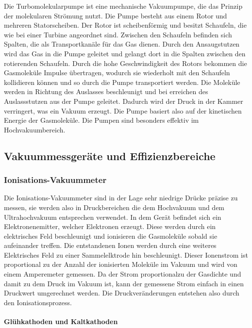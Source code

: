 Die Turbomolekularpumpe ist eine mechanische Vakuumpumpe, die das Prinzip der molekularen Strömung nutzt.
Die Pumpe besteht aus einem Rotor und mehreren Statorscheiben. Der Rotor ist scheibenförmig und besitzt Schaufeln, die wie bei einer Turbine angeordnet sind.
Zwischen den Schaufeln befinden sich Spalten, die als Transportkanäle für das Gas dienen.
Durch den Ansaugstutzen wird das Gas in die Pumpe geleitet und gelangt dort in die Spalten zwischen den rotierenden Schaufeln. Durch die
hohe Geschwindigkeit des Rotors bekommen die Gasmoleküle Impulse übertragen, wodurch sie wiederholt mit den Schaufeln kollidieren können und so durch
die Pumpe transportiert werden. Die Moleküle werden in Richtung des Auslasses beschleunigt und bei erreichen des Auslassstutzen aus der Pumpe geleitet.
Dadurch wird der Druck in der Kammer verringert, was ein Vakuum erzeugt.
Die Pumpe basiert also auf der kinetischen Energie der Gasmoleküle. Die Pumpen sind besonders effektiv im Hochvakuumbereich.
\cite{turbomolekularpumpe}

\subsection{Vakuummessgeräte und Effizienzbereiche}
\subsubsection{Ionisations-Vakuummeter}
Die Ionisations-Vakuummeter sind in der Lage sehr niedrige Drücke präzise zu messen, sie werden also in Druckbereichen die dem Hochvakuum 
und dem Ultrahochvakuum entsprechen verwendet. In dem Gerät befindet sich ein Elektronenemitter, welcher Elektronen erzeugt. Diese
werden durch ein elektrisches Feld beschleunigt und ionisieren die Gasmoleküle sobald sie aufeinander treffen. Die entstandenen Ionen werden durch eine 
weiteres Elektrisches Feld zu einer Sammelelktrode hin beschleunigt. Dieser Ionenstrom ist proportional zu der Anzahl der ionisierten Moleküle im Vakuum und 
wird von einem Amperemeter gemessen. Da der Strom proportionalzu der Gasdichte und damit zu dem Druck im Vakuum ist, kann der gemessene Strom einfach in einen 
Druckwert umgerechnet werden. Die Druckveränderungen entstehen also durch den Ionisationsprozess.


\paragraph{Glühkathoden und Kaltkathoden}

